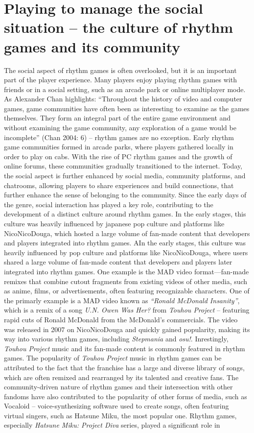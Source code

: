 \section{Playing to manage the social situation -- the culture of rhythm games and its community}
The social aspect of rhythm games is often overlooked, but it is an important part of the player experience. Many players enjoy playing rhythm games with friends or in a social setting, such as an arcade park or online multiplayer mode. As Alexander Chan highlights: “Throughout the history of video and computer games, game communities have often been as interesting to examine as the games themselves. They form an integral part of the entire game environment and without examining the game community, any exploration of a game would be incomplete” (Chan 2004: 6) \cite{arcadeculture} -- rhythm games are no exception. Early rhythm game communities formed in arcade parks, where players gathered locally in order to play on cabs. With the rise of PC rhythm games and the growth of online forums, these communities gradually transitioned to the internet. Today, the social aspect is further enhanced by social media, community platforms, and chatrooms, allowing players to share experiences and build connections, that further enhance the sense of belonging to the community. Since the early days of the genre, social interaction has played a key role, contributing to the development of a distinct culture around rhythm games. In the early stages, this culture was heavily influenced by japanese pop culture and platforms like NicoNicoDouga, which hosted a large volume of fan-made content that developers and players integrated into rhythm games. AIn the early stages, this culture was heavily influenced by pop culture and platforms like NicoNicoDouga, where users shared a large volume of fan-made content that developers and players later integrated into rhythm games. One example is the MAD video format—fan-made remixes that combine cutout fragments from existing videos of other media, such as anime, films, or advertisements, often featuring recognizable characters. One of the primarly example is a MAD video known as \textit{“Ronald McDonald Insanity”}, which is a remix of a song \textit{U.N. Owen Was Her?} from \textit{Touhou Project} -- featuring rapid cuts of Ronald McDonald from the McDonald’s commercials. The video was released in 2007 on NicoNicoDouga and quickly gained popularity, making its way into various rhythm games, including \textit{Stepmania} and \textit{osu!}. Inrestingly, \textit{Touhou Project} music and its fan-made content is commonly featured in rhythm games. The popularity of \textit{Touhou Project} music in rhythm games can be attributed to the fact that the franchise has a large and diverse library of songs, which are often remixed and rearranged by its talented and creative fans. The community-driven nature of rhythm games and their intersection with other fandoms have also contributed to the popularity of other forms of media, such as Vocaloid -- voice-synthesizing software used to create songs, often featuring virtual singers, such as Hatsune Miku, the most popular one. Rhythm games, especially \textit{Hatsune Miku: Project Diva} series, played a significant role in 